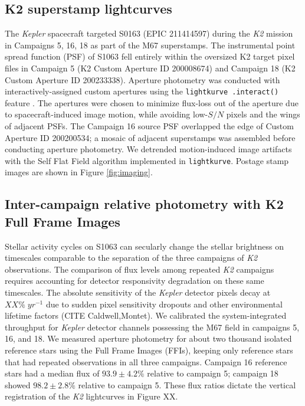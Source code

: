 \documentclass[twocolumn]{emulateapj}%
\begin{document}
\subsection{K2 superstamp lightcurves}
The \emph{Kepler} spacecraft targeted S0163 (EPIC 211414597) during the \emph{K2} mission \citep{howell14} in Campaigns 5, 16, 18 as part of the M67 superstamps.  The instrumental point spread function (PSF) of S1063 fell entirely within the oversized K2 target pixel files in Campaign 5 (K2 Custom Aperture ID 200008674) and Campaign 18 (K2 Custom Aperture ID 200233338).  Aperture photometry was conducted with interactively-assigned custom apertures using the \texttt{lightkurve .interact()} feature \citep{geert_barentsen_2019_2565212}. The apertures were chosen to minimize flux-loss out of the aperture due to spacecraft-induced image motion, while avoiding low-$S/N$ pixels and the wings of adjacent PSFs.  The Campaign 16 source PSF overlapped the edge of Custom Aperture ID 200200534; a mosaic of adjacent superstamps was assembled before conducting aperture photometry.
We detrended motion-induced image artifacts with the Self Flat Field algorithm \citep{vanderburg14} implemented in \texttt{lightkurve}.  Postage stamp images are shown in Figure \ref{fig:imaging}.

\subsection{Inter-campaign relative photometry with K2 Full Frame Images}

Stellar activity cycles on S1063 can secularly change the stellar brightness on timescales comparable to the separation of the three campaigns of \emph{K2} observations.  The comparison of flux levels among repeated \emph{K2} campaigns requires accounting for detector responsivity degradation on these same timescales.  The absolute sensitivity of the \emph{Kepler} detector pixels decay at $XX \%\;yr^{-1}$ due to sudden pixel sensitivity dropouts and other environmental lifetime factors (CITE Caldwell,Montet).  We calibrated the system-integrated throughput for \emph{Kepler} detector channels possessing the M67 field in campaigns 5, 16, and 18.  We measured aperture photometry for about two thousand isolated reference stars using the Full Frame Images (FFIs), keeping only reference stars that had repeated observations in all three campaigns.  Campaign 16 reference stars had a median flux of $93.9\pm4.2\%$ relative to campaign 5; campaign 18 showed $98.2\pm2.8\%$ relative to campaign 5.  These flux ratios dictate the vertical registration of the \emph{K2} lightcurves in Figure XX.
\end{document}
